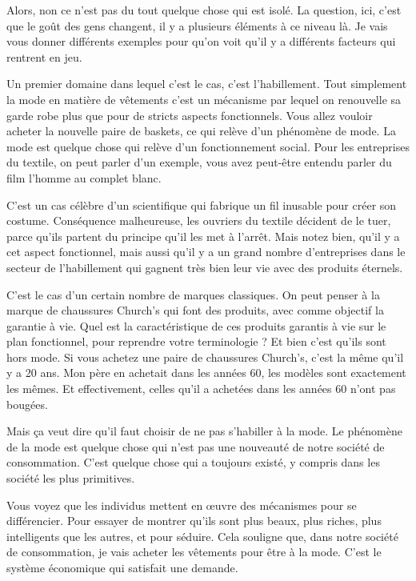 \begin{small}
Alors, non ce n'est pas du tout quelque chose qui est isolé. La question, ici, c'est que le goût des gens changent, il y a plusieurs éléments à ce niveau là. Je vais vous donner différents exemples pour qu'on voit qu'il y a différents facteurs qui rentrent en jeu. 

Un premier domaine dans lequel c'est le cas, c'est l'habillement. Tout simplement la mode en matière de vêtements c'est un mécanisme par lequel on renouvelle sa garde robe plus que pour de stricts aspects fonctionnels.  Vous allez vouloir acheter la nouvelle paire de baskets, ce qui relève d'un phénomène de mode. La mode est quelque chose qui relève d'un fonctionnement social. Pour les entreprises du textile, on peut parler d'un exemple, vous avez peut-être entendu parler du film l'homme au complet blanc. 


C'est un cas célèbre d'un scientifique  qui fabrique un fil inusable pour créer son costume. Conséquence malheureuse, les ouvriers du textile décident de le tuer, parce qu'ils partent du principe qu'il les met à l’arrêt. 
\smallbreak
Mais notez bien, qu'il y a cet aspect fonctionnel, mais aussi qu'il y a un grand nombre d'entreprises dans le secteur de l'habillement qui gagnent très  bien leur vie avec des produits éternels. 

C'est le cas d'un certain nombre de marques classiques. On peut penser à la marque de chaussures Church's qui font des produits, avec comme objectif la garantie à vie. Quel est la caractéristique de ces produits garantis à vie sur le plan fonctionnel, pour reprendre votre terminologie ?  Et bien c'est qu'ils sont hors mode. Si vous achetez une paire de chaussures Church's, c'est la même qu'il y a 20 ans. Mon père en achetait dans les années 60, les modèles sont exactement les mêmes. Et effectivement, celles qu'il a achetées dans les années 60 n'ont pas bougées. 

Mais ça veut dire qu'il faut choisir de ne pas s'habiller à la mode. Le phénomène de la mode est quelque chose qui n'est pas une nouveauté de notre société de consommation. C'est quelque chose qui a toujours existé, y compris dans les société les plus primitives. 

Vous voyez que les individus mettent en œuvre des mécanismes pour se différencier. Pour essayer de montrer qu'ils sont plus beaux, plus riches, plus intelligents que les autres, et pour séduire. Cela souligne que, dans notre société de consommation, je vais acheter les vêtements pour être à la mode. C'est le système économique qui satisfait une demande. 


\end{small}
